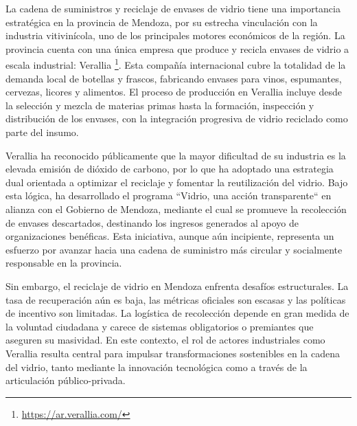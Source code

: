 La cadena de suministros y reciclaje de envases de vidrio tiene una importancia estratégica en la provincia de Mendoza, por su estrecha vinculación con la industria vitivinícola, uno de los principales motores económicos de la región. La provincia cuenta con una única empresa que produce y recicla envases de vidrio a escala industrial: Verallia \footnote{\url{https://ar.verallia.com/}}. Esta compañía internacional cubre la totalidad de la demanda local de botellas y frascos, fabricando envases para vinos, espumantes, cervezas, licores y alimentos. El proceso de producción en Verallia incluye desde la selección y mezcla de materias primas hasta la formación, inspección y distribución de los envases, con la integración progresiva de vidrio reciclado como parte del insumo.

Verallia ha reconocido públicamente que la mayor dificultad de su industria es la elevada emisión de dióxido de carbono, por lo que ha adoptado una estrategia dual orientada a optimizar el reciclaje y fomentar la reutilización del vidrio. Bajo esta lógica, ha desarrollado el programa ``Vidrio, una acción transparente`` en alianza con el Gobierno de Mendoza, mediante el cual se promueve la recolección de envases descartados, destinando los ingresos generados al apoyo de organizaciones benéficas. Esta iniciativa, aunque aún incipiente, representa un esfuerzo por avanzar hacia una cadena de suministro más circular y socialmente responsable en la provincia.

Sin embargo, el reciclaje de vidrio en Mendoza enfrenta desafíos estructurales. La tasa de recuperación aún es baja, las métricas oficiales son escasas y las políticas de incentivo son limitadas. La logística de recolección depende en gran medida de la voluntad ciudadana y carece de sistemas obligatorios o premiantes que aseguren su masividad. En este contexto, el rol de actores industriales como Verallia resulta central para impulsar transformaciones sostenibles en la cadena del vidrio, tanto mediante la innovación tecnológica como a través de la articulación público-privada.


